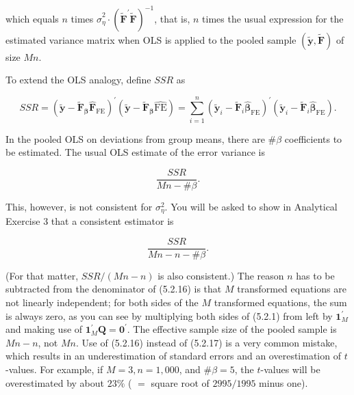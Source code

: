 \documentclass[10pt]{article}
\begin{document}
which equals $n$ times $\hat{\sigma}_{\eta}^{2} \cdot\left(\widetilde{\mathbf{F}}^{\prime} \widetilde{\mathbf{F}}\right)^{-1}$, that is, $n$ times the usual expression for the estimated variance matrix when OLS is applied to the pooled sample $(\tilde{\mathbf{y}}, \tilde{\mathbf{F}})$ of size $M n$.

To extend the OLS analogy, define $S S R$ as


\begin{equation*}
S S R=\left(\tilde{\mathbf{y}}-\widetilde{\mathbf{F}}_{\boldsymbol{\beta}} \widehat{\boldsymbol{F}}_{\mathrm{FE}}\right)^{\prime}\left(\tilde{\mathbf{y}}-\widetilde{\mathbf{F}}_{\boldsymbol{\boldsymbol { \beta }}} \widehat{\mathrm{FE}}\right)=\sum_{i=1}^{n}\left(\tilde{\mathbf{y}}_{i}-\widetilde{\mathbf{F}}_{i} \widehat{\boldsymbol{\beta}}_{\mathrm{FE}}\right)^{\prime}\left(\tilde{\mathbf{y}}_{i}-\widetilde{\mathbf{F}}_{i} \widehat{\boldsymbol{\beta}}_{\mathrm{FE}}\right) . \tag{5.2.15}
\end{equation*}


In the pooled OLS on deviations from group means, there are $\# \beta$ coefficients to be estimated. The usual OLS estimate of the error variance is


\begin{equation*}
\frac{S S R}{M n-\# \beta} . \tag{5.2.16}
\end{equation*}


This, however, is not consistent for $\sigma_{\eta}^{2}$. You will be asked to show in Analytical Exercise 3 that a consistent estimator is


\begin{equation*}
\frac{S S R}{M n-n-\# \beta} . \tag{5.2.17}
\end{equation*}


(For that matter, $S S R /(M n-n)$ is also consistent.) The reason $n$ has to be subtracted from the denominator of (5.2.16) is that $M$ transformed equations are not linearly independent; for both sides of the $M$ transformed equations, the sum is always zero, as you can see by multiplying both sides of (5.2.1) from left by $\mathbf{1}_{M}^{\prime}$ and making use of $\mathbf{1}_{M}^{\prime} \mathbf{Q}=\mathbf{0}^{\prime}$. The effective sample size of the pooled sample is $M n-n$, not $M n$. Use of (5.2.16) instead of (5.2.17) is a very common mistake, which results in an underestimation of standard errors and an overestimation of $t$-values. For example, if $M=3, n=1,000$, and $\# \beta=5$, the $t$-values will be overestimated by about $23 \%$ ( $=$ square root of $2995 / 1995$ minus one).
\end{document}
